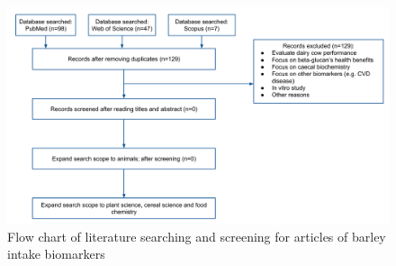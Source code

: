 \begin{figure}[h!]
	\centering
	\includegraphics[width=\linewidth]{picture/barley_biomarker_review}
	\caption{Flow chart of literature searching and screening for articles of barley intake biomarkers}
	\label{fig:barleybiomarkerreview}
\end{figure}



